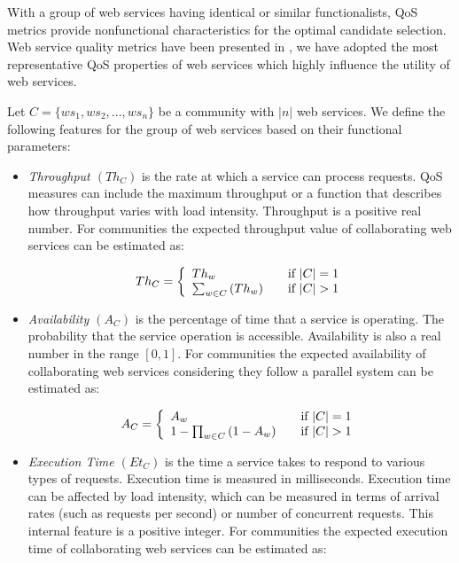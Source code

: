 \documentclass[10pt,journal,cspaper,compsoc]{IEEEtran}
\begin{document}
With a group of web services having identical or similar functionalists, QoS metrics provide nonfunctional characteristics for the optimal candidate selection. Web service quality metrics have been presented in \cite{Ardagna:2007:ASC:1263152.1263531,Menasce:2002:QIW:613357.613758,10.1109/ISSRE.2011.17}, we have adopted the most representative QoS properties of web services which highly influence the utility of web services. 

Let $C = \{ws_1,ws_2,..., ws_n\}$ be a community with $|n|$ web services. We define the following features for the group of web services based on their functional parameters:

\begin{itemize}

  \item \emph{Throughput $(Th_{C})$} is the rate at which a service can process requests. QoS measures can include the maximum throughput or a function that describes how throughput varies with load intensity. Throughput is a positive real number. For communities the expected throughput value of collaborating web services can be estimated as:
	
	\begin{equation}
		 Th_{C} = \left\{ 
			\begin{array}{l l}
				Th_{w} & \quad \text{if $|C| = 1$}\\
				\sum_{w \in C}{(Th_{w})} & \quad \text{if $|C| > 1$}
			\end{array} \right.
	\end{equation}
	
	\item \emph{Availability $(A_{C})$} is the percentage of time that a service is operating.
	The probability that the service operation is accessible. Availability is also a real number in the range $[0, 1]$. For communities the expected availability of collaborating web services considering they follow a parallel system can be estimated as:
	
	\begin{equation}
		A_{C} = \left\{ 
			\begin{array}{l l}
				A_{w} & \quad \text{if $|C| = 1$}\\
				1-\prod_{w \in C}{(1-A_{w})} & \quad \text{if $|C| > 1$}
			\end{array} \right.
	\end{equation}
	
	\item \emph{Execution Time $(Et_{C})$} is the time a service takes to respond to various types of requests. 
	Execution time is measured in milliseconds. Execution time can be affected by load intensity, which can be measured in terms of arrival rates (such as requests per second) or number of concurrent requests. This internal feature is a positive integer. For communities the expected execution time of collaborating web services can be estimated as:
	

\end{itemize}
\end{document}
